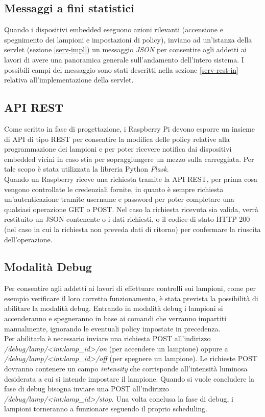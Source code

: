 \subsection{Messaggi a fini statistici}
Quando i dispositivi embedded eseguono azioni rilevanti (accensione e spegnimento dei lampioni e impostazioni di policy), inviano ad un'istanza della servlet (sezione \ref{serv-impl}) un messaggio \textit{JSON} per consentire agli addetti ai lavori di avere una panoramica generale sull'andamento dell'intero sistema.
I possibili campi del messaggio sono stati descritti nella sezione \ref{serv-rest-in} relativa all'implementazione della servlet.

\subsection{API REST}
Come scritto in fase di progettazione, i Raspberry Pi devono esporre un insieme di API di tipo REST per consentire la modifica delle policy relative alla programmazione dei lampioni e per poter ricevere notifica dai dispositivi embedded vicini in caso stia per sopraggiungere un mezzo sulla carreggiata.
Per tale scopo è stata utilizzata la libreria Python \textit{Flask}.
\\Quando un Raspberry riceve una richiesta tramite la API REST, per prima cosa vengono controllate le credenziali fornite, in quanto è sempre richiesta un'autenticazione tramite username e password per poter completare una qualsiasi operazione GET o POST.
Nel caso la richiesta ricevuta sia valida, verrà restituito un JSON contenente o i dati richiesti, o il codice di stato HTTP 200 (nel caso in cui la richiesta non preveda dati di ritorno) per confermare la riuscita dell'operazione.

\subsection{Modalità Debug}
Per consentire agli addetti ai lavori di effettuare controlli sui lampioni, come per esempio verificare il loro corretto funzionamento, è stata prevista la possibilità di abilitare la modalità debug.
Entrando in modalità debug i lampioni si accenderanno e spegneranno in base ai comandi che verranno impartiti manualmente, ignorando le eventuali policy impostate in precedenza.
\\Per abilitarla è necessario inviare una richiesta POST all'indirizzo \textit{/debug/lamp/<int:lamp\_id>/on} (per accendere un lampione) oppure a \textit{/debug/lamp/<int:lamp\_id>/off} (per spegnere un lampione).
Le richieste POST dovranno contenere un campo \textit{intensity} che corrisponde all'intensità luminosa desiderata a cui si intende impostare il lampione.
Quando si vuole concludere la fase di debug bisogna inviare una POST all'indirizzo \textit{/debug/lamp/<int:lamp\_id>/stop}.
Una volta conclusa la fase di debug, i lampioni torneranno a funzionare seguendo il proprio scheduling.

